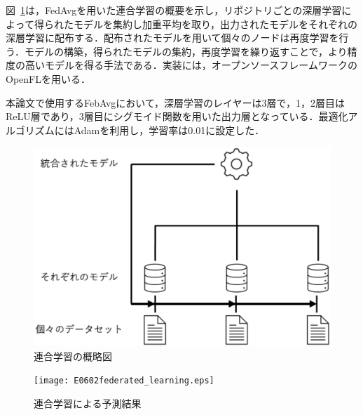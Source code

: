\documentclass[uplatex,dvipdfmx,a4paper,twocolumn,base=11pt,jbase=11pt,ja=standard]{bxjsarticle}  %
\begin{document}
図~\ref{fig:explain}は，FedAvgを用いた連合学習の概要を示し，リポジトリごとの深層学習によって得られたモデルを集約し加重平均を取り，出力されたモデルをそれぞれの深層学習に配布する．配布されたモデルを用いて個々のノードは再度学習を行う．モデルの構築，得られたモデルの集約，再度学習を繰り返すことで，より精度の高いモデルを得る手法である．実装には，オープンソースフレームワークのOpenFLを用いる．

本論文で使用するFebAvgにおいて，深層学習のレイヤーは3層で，1，2層目はReLU層であり，3層目にシグモイド関数を用いた出力層となっている．最適化アルゴリズムにはAdamを利用し，学習率は0.01に設定した．



\begin{figure}
\begin{center}
\includegraphics[width=0.9\linewidth]{federated_learning_exp.eps}
\caption{連合学習の概略図}
\label{fig:explain}
\end{center}
\end{figure}

\begin{figure}
\begin{center}
\texttt{[image: E0602federated\_learning.eps]}
\caption{連合学習による予測結果}
\label{fig:fed}
\end{center}
\end{figure}
\end{document}
